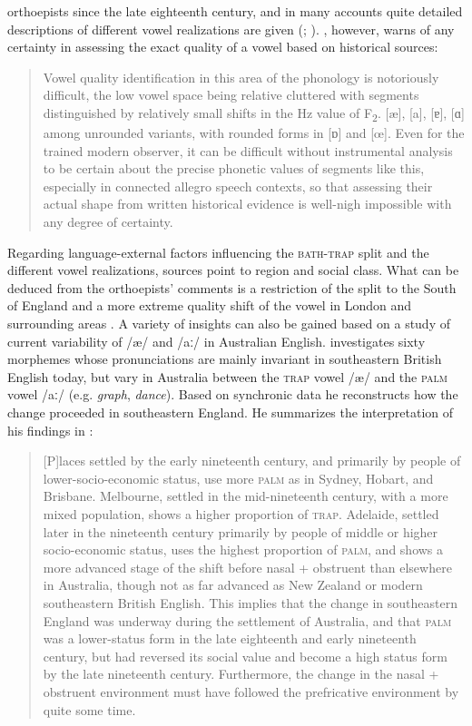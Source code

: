 orthoepists since the late eighteenth century, and in many accounts quite detailed descriptions of different vowel realizations are given (\citealt[455--456]{MacMahon1998}; \citealt[193--198]{Jones2006}). \citet[189-190]{Jones2006}, however, warns of any certainty in assessing the exact quality of a vowel based on historical sources:


\begin{quote}
Vowel quality identification in this area of the phonology is notoriously difficult, the low vowel space being relative cluttered with segments distinguished by relatively small shifts in the Hz value of F\textsubscript{2}. [æ], [a], [ɐ], [ɑ] among unrounded variants, with rounded forms in [ɒ] and [œ]. Even for the trained modern observer, it can be difficult without instrumental analysis to be certain about the precise phonetic values of segments like this, especially in connected allegro speech contexts, so that assessing their actual shape from written historical evidence is well-nigh impossible with any degree of certainty.
\end{quote}

Regarding language-external factors influencing the \textsc{bath-trap} split and the different vowel realizations, sources point to region and social class. What can be deduced from the orthoepists’ comments is a restriction of the split to the South of England and a more extreme quality shift of the vowel in London and surrounding areas \citep[106--107]{Lass1999b}. A variety of insights can also be gained based on a study of current variability of /æ/ and /aː/ in Australian English. \citet{Bradley1991} investigates sixty morphemes whose pronunciations are mainly invariant in southeastern British English today, but vary in Australia between the \textsc{trap} vowel /æ/ and the \textsc{palm} vowel /aː/ (e.g. \textit{graph}, \textit{dance}). Based on synchronic data he reconstructs how the change proceeded in southeastern England. He summarizes the interpretation of his findings in \citet{Bradley2008}:

\begin{quote}
[P]laces settled by the early nineteenth century, and primarily by people of lower-socio-economic status, use more \textsc{palm} as in Sydney, Hobart, and Brisbane. Melbourne, settled in the mid-nineteenth century, with a more mixed population, shows a higher proportion of \textsc{trap}. Adelaide, settled later in the nineteenth century primarily by people of middle or higher socio-economic status, uses the highest proportion of \textsc{palm}, and shows a more advanced stage of the shift before nasal + obstruent than elsewhere in Australia, though not as far advanced as New Zealand or modern southeastern British English. This implies that the change in southeastern England was underway during the settlement of Australia, and that \textsc{palm} was a lower-status form in the late eighteenth and early nineteenth century, but had reversed its social value and become a high status form by the late nineteenth century. Furthermore, the change in the nasal + obstruent environment must have followed the prefricative environment by quite some time.
\end{quote}


